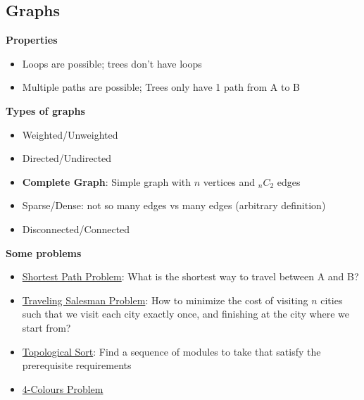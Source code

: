 \documentclass{article}
\begin{document}
\begin{multicols}{2}
\section{Graphs}
\textbf{Properties}
\begin{itemize}
	\item Loops are possible; trees don't have loops
	\item Multiple paths are possible; Trees only have 1 path from A to B
\end{itemize}
\textbf{Types of graphs}
\begin{itemize}
	\item Weighted/Unweighted
	\item Directed/Undirected
	\item \textbf{Complete Graph}: Simple graph with $n$ vertices and $_nC_2$ edges
	\item Sparse/Dense: not so many edges vs many edges (arbitrary definition)
	\item Disconnected/Connected
\end{itemize}
\textbf{Some problems}
\begin{itemize}
	\item \underline{Shortest Path Problem}: What is the shortest way to travel between A and B?
	\item \underline{Traveling Salesman Problem}: How to minimize the cost of visiting $n$ cities such that we visit each city exactly once, and finishing at the city where we start from?
	\item \underline{Topological Sort}: Find a sequence of modules to take that satisfy the prerequisite requirements
	\item \underline{4-Colours Problem}
\end{itemize}

\end{multicols}
\end{document}

